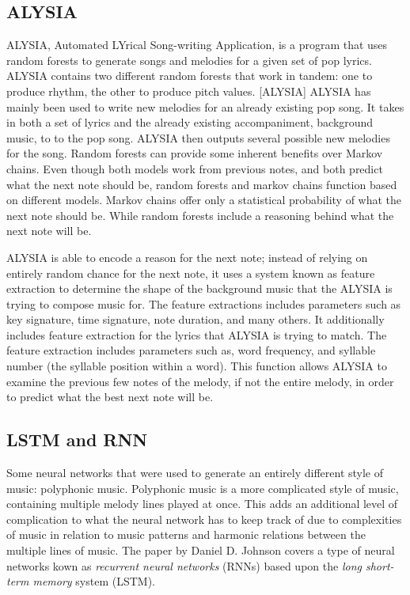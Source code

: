 \documentclass{sig-alternate}
\begin{document}
\subsection{ALYSIA}
\label{sec:ALYSIA}
	ALYSIA, Automated LYrical Song-writing Application, is a program that uses random forests to generate songs and melodies for a given set of pop lyrics. ALYSIA contains two different random forests that work in tandem: one to produce rhythm, the other to produce pitch values. [ALYSIA] ALYSIA has mainly been used to write new melodies for an already existing pop song. It takes in both a set of lyrics and the already existing accompaniment, background music,  to to the pop song. ALYSIA then outputs several possible new melodies for the song. Random forests can provide some inherent benefits over Markov chains. Even though both models work from previous notes, and both predict what the next note should be, random forests and markov chains function based on different models. Markov chains offer only a statistical probability of what the next note should be. While random forests include a reasoning behind what the next note will be.
	
	ALYSIA is able to encode a reason for the next note; instead of relying on entirely random chance for the next note, it uses a system known as feature extraction to determine the shape of the background music that the ALYSIA is trying to compose music for. The feature extractions includes parameters such as key signature, time signature, note duration, and many others. It additionally includes feature extraction for the lyrics that ALYSIA is trying to match. The feature extraction includes parameters such as, word frequency, and syllable number (the syllable position within a word). This function allows ALYSIA to examine the previous few notes of the melody, if not the entire melody, in order to predict what the best next note will be.

\subsection{LSTM and RNN}
\label{sec:lstm}
 	Some neural networks that were used to generate an entirely different style of music: polyphonic music. Polyphonic music is a more complicated style of music, containing multiple melody lines played at once. This adds an additional level of complication to what the neural network has to keep track of due to complexities of music in relation to music patterns and harmonic relations between the multiple lines of music. The paper by Daniel D. Johnson covers a type of neural networks kown as \textit{recurrent neural networks} (RNNs) based upon the \textit{long short-term memory} system (LSTM).
\end{document}
